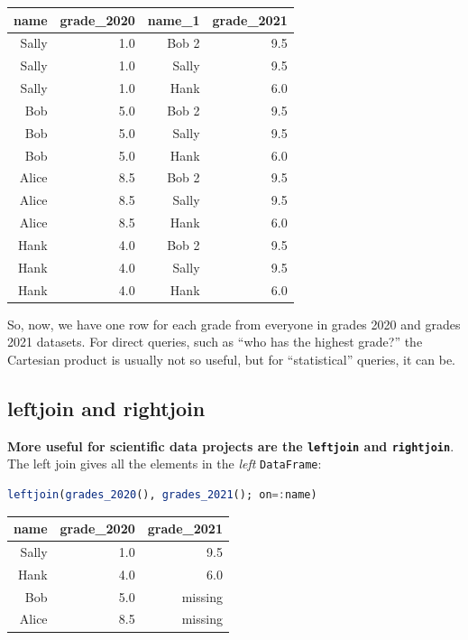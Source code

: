 \documentclass[
  notoc %
]{tufte-book}
\newcommand{\passthrough}[1]{#1}
\begin{document}
\begin{longtable}[]{@{}rrrr@{}}
\toprule
name & grade\_2020 & name\_1 & grade\_2021 \\
\midrule
\endhead
Sally & 1.0 & Bob 2 & 9.5 \\
Sally & 1.0 & Sally & 9.5 \\
Sally & 1.0 & Hank & 6.0 \\
Bob & 5.0 & Bob 2 & 9.5 \\
Bob & 5.0 & Sally & 9.5 \\
Bob & 5.0 & Hank & 6.0 \\
Alice & 8.5 & Bob 2 & 9.5 \\
Alice & 8.5 & Sally & 9.5 \\
Alice & 8.5 & Hank & 6.0 \\
Hank & 4.0 & Bob 2 & 9.5 \\
Hank & 4.0 & Sally & 9.5 \\
Hank & 4.0 & Hank & 6.0 \\
\bottomrule
\end{longtable}

So, now, we have one row for each grade from everyone in grades 2020 and
grades 2021 datasets. For direct queries, such as ``who has the highest
grade?'' the Cartesian product is usually not so useful, but for
``statistical'' queries, it can be.

\hypertarget{sec:leftjoin_rightjoin}{%
\subsection{leftjoin and rightjoin}\label{sec:leftjoin_rightjoin}}

\textbf{More useful for scientific data projects are the
\passthrough{\lstinline!leftjoin!} and
\passthrough{\lstinline!rightjoin!}}. The left join gives all the
elements in the \emph{left} \passthrough{\lstinline!DataFrame!}:

\begin{lstlisting}[language=Julia]
leftjoin(grades_2020(), grades_2021(); on=:name)
\end{lstlisting}

\begin{longtable}[]{@{}rrr@{}}
\toprule
name & grade\_2020 & grade\_2021 \\
\midrule
\endhead
Sally & 1.0 & 9.5 \\
Hank & 4.0 & 6.0 \\
Bob & 5.0 & missing \\
Alice & 8.5 & missing \\
\bottomrule
\end{longtable}
\end{document}
